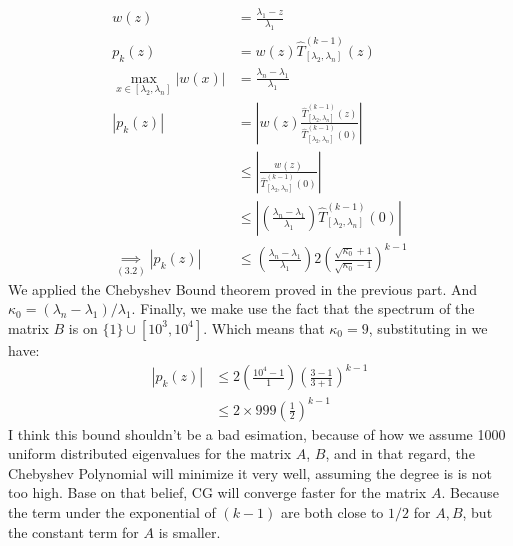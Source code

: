\documentclass[]{article}
\begin{document}
    \begin{align*}\tag{3.6}\label{eqn:3.6}
        w(z) &=  \frac{\lambda_1 - z}{\lambda_1} 
        \\
        p_k(z) &= w(z)\hat{T}_{[\lambda_2, \lambda_n]}^{(k - 1)}(z)
        \\
        \max_{x\in[\lambda_2, \lambda_n]} |w(x)| &=
        \frac{\lambda_n - \lambda_1}{\lambda_1}
        \\
        |p_k(z)| &= 
        \left|
            w(z) 
            \frac{\hat{T}_{[\lambda_2, \lambda_n]}^{(k - 1)}(z)}
            {
                \hat{T}_{[\lambda_2, \lambda_n]}^{(k - 1)}(0)
            }
        \right|
        \\
        &\le 
        \left|
            \frac{w(z)}{\hat{T}_{[\lambda_2, \lambda_n]}^{(k - 1)}(0)}
        \right|
        \\
        & \le
        \left| 
            \left(
                \frac{\lambda_n - \lambda_1}{\lambda_1}
            \right)
            \hat{T}_{[\lambda_2, \lambda_n]}^{(k - 1)}(0)
        \right|
        \\
        \underset{\hyperref[eqn:3.2]{(3.2)}}{\implies}
        |p_k(z)|& \le   
        \left(
            \frac{\lambda_n - \lambda_1}{\lambda_1}
        \right)
        2\left(
            \frac{\sqrt{\kappa_0} + 1}{\sqrt{\kappa_0} - 1}
        \right)^{k - 1}
    \end{align*}
    We applied the Chebyshev Bound theorem proved in the previous part. And $\kappa_0 = (\lambda_n - \lambda_1)/\lambda_1$. Finally, we make use the fact that the spectrum of the matrix $B$ is on $\{1\}\cup[10^3, 10^4]$. Which means that $\kappa_0 = 9$, substituting in we have: 
    \begin{align*}\tag{3.7}\label{eqn:3.7}
        |p_k(z)|& \le   
        2
        \left(
            \frac{10^4 - 1}{1}
        \right)
        \left(
            \frac{3 - 1}{3 + 1}
        \right)^{k - 1}
        \\
        & \le 
        2\times999\left(\frac{1}{2}\right)^{k - 1}
    \end{align*}
    I think this bound shouldn't be a bad esimation, because of how we assume 1000 uniform distributed eigenvalues for the matrix $A$, $B$, and in that regard, the Chebyshev Polynomial will minimize it very well, assuming the degree is is not too high. Base on that belief, CG will converge faster for the matrix $A$. Because the term under the exponential of $(k - 1)$ are both close to $1/2$ for $A, B$, but the constant term for $A$ is smaller. 
\end{document}
